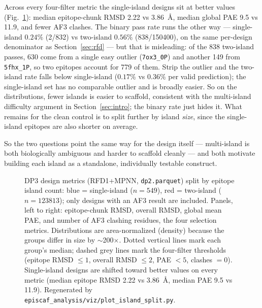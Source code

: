 Across every four-filter metric the single-island designs sit at better values
(Fig.~\ref{fig:islands}): median epitope-chunk RMSD 2.22 vs \SI{3.86}{\angstrom}, median
global PAE 9.5 vs 11.9, and fewer AF3 clashes. The binary pass rate runs the other way ---
single-island $0.24\%$ (\num{2}/\num{832}) vs two-island $0.56\%$ (\num{838}/\num{150400}), on
the same per-design denominator as Section~\ref{sec:rfd} --- but that is misleading: of the
\num{838} two-island passes, \num{630} come from a single easy outlier (\texttt{7ox3\_0P}) and
another \num{149} from \texttt{5fhx\_1P}, so two epitopes account for \num{779} of them. Strip
the outlier and the two-island rate falls below single-island ($0.17\%$ vs $0.36\%$ per valid
prediction); the single-island set has no comparable outlier and is broadly easier. So on the
distributions, fewer islands is easier to scaffold, consistent with the multi-island
difficulty argument in Section~\ref{sec:intro}; the binary rate just hides it. What remains for
the clean control is to split further by island \emph{size}, since the single-island epitopes
are also shorter on average.

So the two questions point the same way for the design itself --- multi-island is both
biologically ambiguous and harder to scaffold cleanly --- and both motivate building each
island as a standalone, individually testable construct.

\begin{figure}[h]\centering
{}
\caption{DP3 design metrics (RFD1+MPNN, \texttt{dp2.parquet}) split by epitope island count:
\textcolor[HTML]{1f77b4}{blue} = single-island ($n=549$),
\textcolor[HTML]{d62728}{red} = two-island ($n=\num{123813}$); only designs with an AF3
result are included. Panels, left to right: epitope-chunk RMSD, overall RMSD, global mean PAE,
and number of AF3 clashing residues, the four selection metrics. Distributions are
area-normalized (density) because the groups differ in size by $\sim$200$\times$. Dotted
vertical lines mark each group's median; dashed grey lines mark the four-filter thresholds
(epitope RMSD $\le 1$, overall RMSD $\le 2$, PAE $< 5$, clashes $= 0$). Single-island designs
are shifted toward better values on every metric (median epitope RMSD 2.22 vs
\SI{3.86}{\angstrom}, median PAE 9.5 vs 11.9). Regenerated by
\texttt{episcaf\_analysis/viz/plot\_island\_split.py}.}
\label{fig:islands}
\end{figure}
